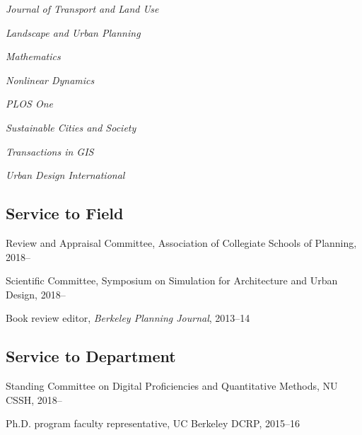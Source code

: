 \documentclass[12pt,letterpaper]{report}
\newcommand{\listitemspace}{0.15em}
\renewenvironment{itemize}
{\begin{list}{}{\setlength{\leftmargin}{0em}
			\setlength{\parskip}{0em}
			\setlength{\itemsep}{\listitemspace}
			\setlength{\parsep}{\listitemspace}}}
	{\end{list}}
\begin{document}
\begin{tablist}
\begin{itemize}
		\item \textit{Journal of Transport and Land Use}
		
		\item \textit{Landscape and Urban Planning}
		
		\item \textit{Mathematics}
		
		\item \textit{Nonlinear Dynamics}
		
		\item \textit{PLOS One}
		
		\item \textit{Sustainable Cities and Society}
		
		\item \textit{Transactions in GIS}
		
		\item \textit{Urban Design International}
		
	\end{itemize}
	
	\subsection*{Service to Field}
	
	\begin{itemize}
		
		\item Review and Appraisal Committee, Association of Collegiate Schools of Planning, 2018--
		
		\item Scientific Committee, Symposium on Simulation for Architecture and Urban Design, 2018--
		
		\item Book review editor, \textit{Berkeley Planning Journal}, 2013--14
		
	\end{itemize}
	
	\subsection*{Service to Department}
	
	\begin{itemize}
		
		\item Standing Committee on Digital Proficiencies and Quantitative Methods, NU CSSH, 2018--
		
		\item Ph.D. program faculty representative, UC Berkeley DCRP, 2015--16
		

\end{itemize}
\end{tablist}
\end{document}
